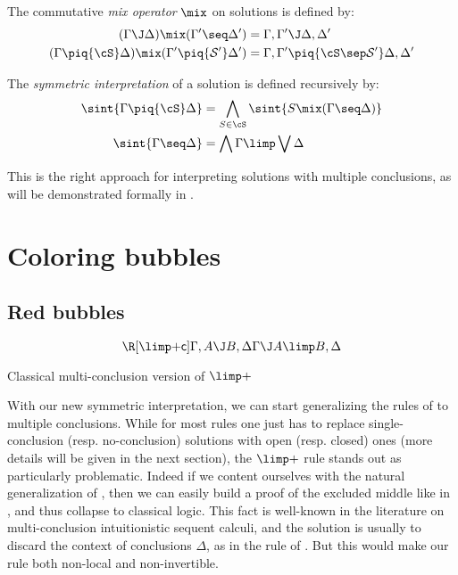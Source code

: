\begin{definition}
  The commutative \emph{mix operator} $\mix$ on solutions is defined by:
  \begin{align*}
    (\Gamma \J \Delta) \mix (\Gamma' \seq \Delta') &=
      \Gamma, \Gamma' \J \Delta, \Delta' \\
    (\Gamma \piq{\cS} \Delta) \mix (\Gamma' \piq{\mathcal{S'}} \Delta') &=
      \Gamma, \Gamma' \piq{\cS \sep \mathcal{S'}} \Delta, \Delta' \\
  \end{align*}
\end{definition}

\begin{definition}
  The \emph{symmetric interpretation} of a solution is defined recursively by:
  \begin{align*}
    \sint{\Gamma \piq{\cS} \Delta} &=
      \bigwedge_{S \in \cS} \sint{S \mix (\Gamma \seq \Delta)} \\
    \sint{\Gamma \seq \Delta} &=
      \bigwedge \Gamma \limp \bigvee \Delta
  \end{align*}
\end{definition}

This is the right approach for interpreting solutions with multiple conclusions,
as will be demonstrated formally in .

\section{Coloring bubbles}

\subsection{Red bubbles}

\begin{marginfigure}
  $$
  \R[\mathsf{{\limp}{+}c}]
    {\Gamma, A \J B, \Delta}
    {\Gamma \J A \limp B, \Delta}
  $$
  \caption{Classical multi-conclusion version of ${\limp}{+}$}
  \label{wrong-imp-pos}
\end{marginfigure}

With our new symmetric interpretation, we can start generalizing the rules of
 to multiple conclusions. While for most rules one just has to replace
single-conclusion (resp. no-conclusion) solutions with open (resp. closed) ones
(more details will be given in the next section), the ${\limp}{+}$ rule stands
out as particularly problematic. Indeed if we content ourselves with the natural
generalization {} of , then we can
easily build a proof of the excluded middle like in , and thus
collapse to classical logic. This fact is well-known in the literature on
multi-conclusion intuitionistic sequent calculi, and the solution is usually to
discard the context of conclusions $\Delta$, as in the {} rule
of . But this would make our rule both non-local and
non-invertible.


